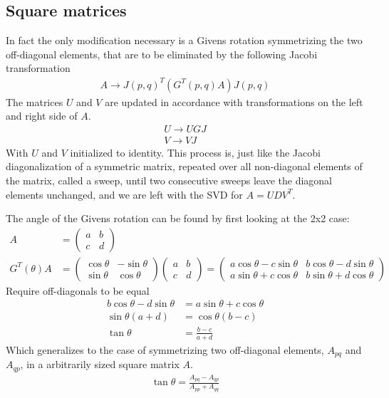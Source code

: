 \documentclass{article}
\begin{document}
    \subsection{Square matrices}
    In fact the only modification necessary is a Givens rotation symmetrizing the two off-diagonal elements, that are to be eliminated by the following Jacobi transformation
    \begin{align}
    	A\to J(p,q)^T \left(G^T(p,q)A\right) J(p,q)
    \end{align}
	The matrices $ U $ and $ V $ are updated in accordance with transformations on the left and right side of $ A $.
	\begin{align}
		U\to UGJ\\
		V\to VJ
	\end{align}
	With $ U $ and $ V $ initialized to identity. This process is, just like the Jacobi diagonalization of a symmetric matrix, repeated over all non-diagonal elements of the matrix, called a sweep, until two consecutive sweeps leave the diagonal elements unchanged, and we are left with the SVD for $ A =UDV^T$.
	
    The angle of the Givens rotation can be found by first looking at the 2x2 case:
    \begin{align}
    	A &= \begin{pmatrix}
    		a & b\\
    		c & d
    	\end{pmatrix}\\
    G^T(\theta) A &= \begin{pmatrix}
    	\cos\theta & -\sin\theta\\
    	\sin\theta & \cos\theta
    \end{pmatrix}\begin{pmatrix}
    a & b\\
    c & d
	\end{pmatrix} = \begin{pmatrix}
	a\cos\theta - c\sin\theta  & b\cos\theta - d\sin\theta\\
	a\sin\theta + c\cos\theta & b\sin\theta + d\cos\theta
\end{pmatrix}
    \end{align}
    Require off-diagonals to be equal
    \begin{align}
    	b\cos\theta - d\sin\theta &= a\sin\theta + c\cos\theta\\
    	\sin\theta (a + d) &= \cos\theta (b - c)\\
    	\tan\theta &= \frac{b-c}{a+d}
    \end{align}
	Which generalizes to the case of symmetrizing two off-diagonal elements, $ A_{pq} $ and $ A_{qp} $, in a arbitrarily sized square matrix $ A $.
	\begin{align}
		\tan\theta = \frac{A_{pq} - A_{qp}}{A_{pp} + A_{qq}}
	\end{align}
\end{document}
